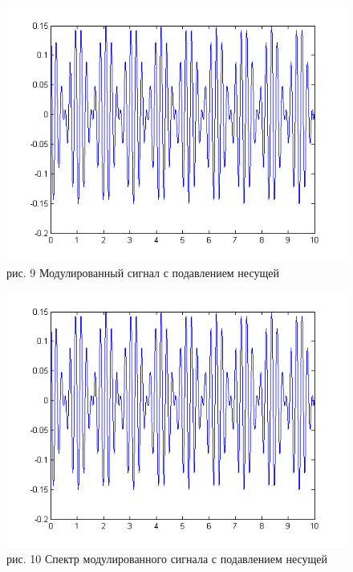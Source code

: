 \documentclass[10pt,a4paper]{report}
\begin{document}
\begin{figure}
\begin{center}
\includegraphics[angle=0, scale = 0.8]{2_2.png}\newline
рис. 9  Модулированный сигнал с подавлением несущей\newline
\end{center}
\end{figure}
\begin{figure}
\begin{center}
\includegraphics[angle=0, scale = 0.8]{2_2.png}\newline
рис. 10  Спектр модулированного сигнала с подавлением несущей\newline
\end{center}
\end{figure}
\end{document}
